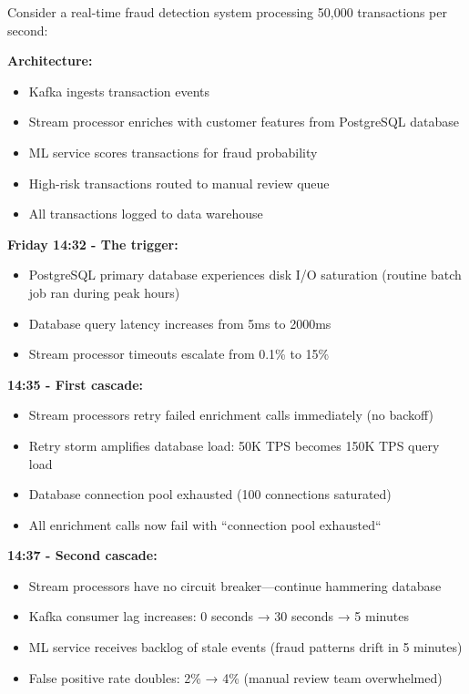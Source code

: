 Consider a real-time fraud detection system processing 50,000 transactions per second:

\textbf{Architecture:}
\begin{itemize}
    \item Kafka ingests transaction events
    \item Stream processor enriches with customer features from PostgreSQL database
    \item ML service scores transactions for fraud probability
    \item High-risk transactions routed to manual review queue
    \item All transactions logged to data warehouse
\end{itemize}

\textbf{Friday 14:32 - The trigger:}
\begin{itemize}
    \item PostgreSQL primary database experiences disk I/O saturation (routine batch job ran during peak hours)
    \item Database query latency increases from 5ms to 2000ms
    \item Stream processor timeouts escalate from 0.1\% to 15\%
\end{itemize}

\textbf{14:35 - First cascade:}
\begin{itemize}
    \item Stream processors retry failed enrichment calls immediately (no backoff)
    \item Retry storm amplifies database load: 50K TPS becomes 150K TPS query load
    \item Database connection pool exhausted (100 connections saturated)
    \item All enrichment calls now fail with ``connection pool exhausted``
\end{itemize}

\textbf{14:37 - Second cascade:}
\begin{itemize}
    \item Stream processors have no circuit breaker---continue hammering database
    \item Kafka consumer lag increases: 0 seconds → 30 seconds → 5 minutes
    \item ML service receives backlog of stale events (fraud patterns drift in 5 minutes)
    \item False positive rate doubles: 2\% → 4\% (manual review team overwhelmed)
\end{itemize}

